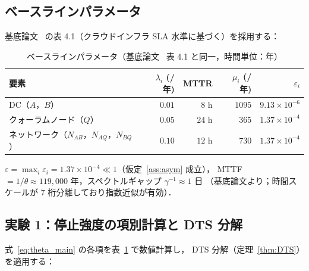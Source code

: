 \documentclass[12pt,a4paper]{article}
\theoremstyle{plain}
\theoremstyle{definition}
\theoremstyle{remark}
\newcommand{\eps}{\varepsilon}         %
\begin{document}
\subsection{ベースラインパラメータ}

基底論文~\cite{habase:v7} の表 4.1（クラウドインフラ SLA 水準に基づく）を採用する：

\begin{table}[H]
  \centering
  \caption{ベースラインパラメータ（基底論文~\cite{habase:v7} 表 4.1 と同一，時間単位：年）}
  \label{tab:params}
  \begin{tabular}{lrrrr}
    \toprule
    要素 & $\lambda_i$ (/年) & MTTR & $\mu_i$ (/年) & $\eps_i$ \\
    \midrule
    DC（$A$，$B$）                                & $0.01$  & $8$ h  & $1095$ & $9.13\times10^{-6}$ \\
    クォーラムノード（$Q$）                        & $0.05$  & $24$ h & $365$  & $1.37\times10^{-4}$ \\
    ネットワーク（$N_{AB}$，$N_{AQ}$，$N_{BQ}$）  & $0.10$  & $12$ h & $730$  & $1.37\times10^{-4}$ \\
    \bottomrule
  \end{tabular}
\end{table}

$\eps = \max_i\eps_i = 1.37\times10^{-4} \ll 1$（仮定~\ref{ass:asym} 成立），
MTTF $= 1/\theta \approx 119{,}000$ 年，スペクトルギャップ $\gamma^{-1}\approx 1$ 日
（基底論文より；時間スケールが 7 桁分離しており指数近似が有効）．

\subsection{実験 1：停止強度の項別計算と DTS 分解}

式~\eqref{eq:theta_main} の各項を表~\ref{tab:params} で数値計算し，
DTS 分解（定理~\ref{thm:DTS}）を適用する：
\end{document}
